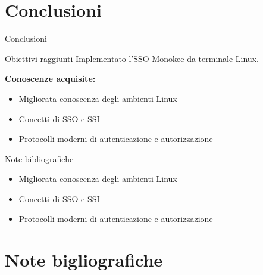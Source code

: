 \documentclass{beamer}
\begin{document}
	\section{Conclusioni}
	\begin{frame}{Conclusioni}
		
		\begin{exampleblock}{Obiettivi raggiunti}
			Implementato l'SSO Monokee da terminale Linux.
		\end{exampleblock}
				
		\vspace{.5em} \textbf{Conoscenze acquisite:} \vspace{.5em}
		\begin{itemize}
			\item Migliorata conoscenza degli ambienti Linux \vspace{.5em}
			\item Concetti di SSO e SSI \vspace{.5em}
			\item Protocolli moderni di autenticazione e autorizzazione \vspace{.5em}
		\end{itemize}
	
	\end{frame}
	
	\begin{frame}{Note bibliografiche}
		
		\begin{itemize}
			\item Migliorata conoscenza degli ambienti Linux \vspace{.5em}
			\item Concetti di SSO e SSI \vspace{.5em}
			\item Protocolli moderni di autenticazione e autorizzazione \vspace{.5em}
		\end{itemize}
	
	\end{frame}
	\section{Note bigliografiche}





\end{document}
